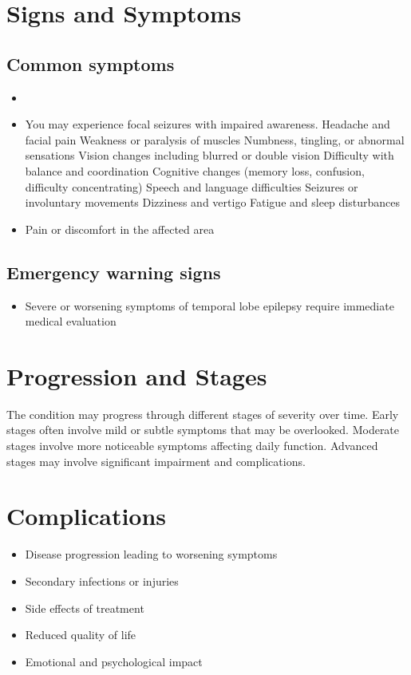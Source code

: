 \section{Signs and Symptoms}
\subsection{Common symptoms}
\begin{itemize}[noitemsep]
  \item \item You may experience focal seizures with impaired awareness. Headache and facial pain Weakness or paralysis of muscles Numbness, tingling, or abnormal sensations Vision changes including blurred or double vision Difficulty with balance and coordination Cognitive changes (memory loss, confusion, difficulty concentrating) Speech and language difficulties Seizures or involuntary movements Dizziness and vertigo Fatigue and sleep disturbances
  \item Pain or discomfort in the affected area
  \end{itemize}
\subsection{Emergency warning signs}
\begin{itemize}[noitemsep]
  \item Severe or worsening symptoms of temporal lobe epilepsy require immediate medical evaluation
\end{itemize}
\section{Progression and Stages}
The condition may progress through different stages of severity over time. Early stages often involve mild or subtle symptoms that may be overlooked. Moderate stages involve more noticeable symptoms affecting daily function. Advanced stages may involve significant impairment and complications.
\section{Complications}
\begin{itemize}[noitemsep]
  \item Disease progression leading to worsening symptoms
  \item Secondary infections or injuries
  \item Side effects of treatment
  \item Reduced quality of life
  \item Emotional and psychological impact
\end{itemize}
